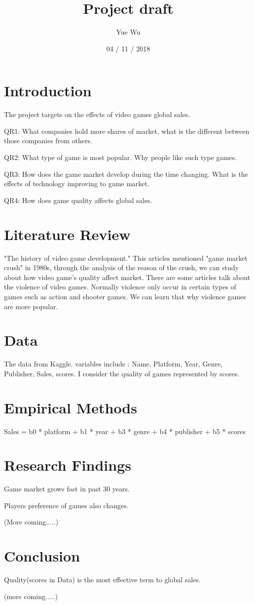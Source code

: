 \documentclass{article}
\title{Project draft}
\author{Yue Wu}
\date{04 / 11 / 2018}
\begin{document}
\maketitle

\section{Introduction}

The project targets on the effects of video games global sales. 

QR1: What companies hold more shares of market, what is the different between those companies from others.

QR2: What type of game is most popular. Why people like such type games.

QR3: How does the game market develop during the time changing. What is the effects of technology improving to game market.

QR4: How does game quality affects global sales.

\section{Literature Review}

"The history of video game development." This articles mentioned "game market crush" in 1980s, through the analysis of  the reason of the crush, we can study about how video game's quality affect market. 
There are some articles talk about the violence of video games. Normally violence only occur in certain types of games such as action and shooter games. We can learn that why violence games are more popular. 

\section{Data}

The data from Kaggle. variables include : Name, Platform, Year, Genre, Publisher, Sales, scores.
I consider the quality of games represented by scores.

\section{Empirical Methods}

Sales = b0 * platform + b1 * year + b3 * genre + b4 * publisher + b5 * scores

\section{Research Findings}

Game market grows fast in past 30 years.

Players preference of games also changes.

(More coming.....)

\section{Conclusion}

Quality(scores in Data) is the most effective term to global sales. 

(more coming.....)
\end{document}
